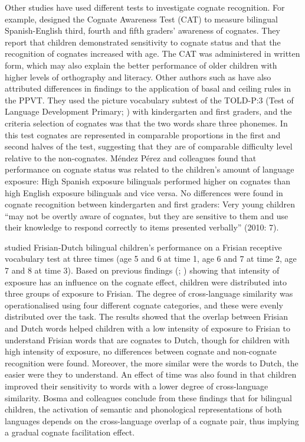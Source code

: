 \documentclass[output=paper,modfonts,nonflat,newtxmath]{langsci/langscibook}
\begin{document}
Other studies have used different tests to investigate cognate recognition. For example, \citet{MalabongaEtAl2008} designed the Cognate Awareness Test (CAT) to measure bilingual Spanish-English third, fourth and fifth graders’ awareness of cognates. They report that children demonstrated sensitivity to cognate status and that the recognition of cognates increased with age. The CAT was administered in written form, which may also explain the better performance of older children with higher levels of orthography and literacy. Other authors such as \citet{MendezPerezEtAl2010} have also attributed differences in findings to the application of basal and ceiling rules in the PPVT. They used the picture vocabulary subtest of the TOLD-P:3 (Test of Language Development Primary; \citealt{NewcomerHammill1997}) with kindergarten and first graders, and the criteria selection of cognates was that the two words share three phonemes. In this test cognates are represented in comparable proportions in the first and second halves of the test, suggesting that they are of comparable difficulty level relative to the non-cognates. Méndez Pérez and colleagues found that performance on cognate status was related to the children’s amount of language exposure: High Spanish exposure bilinguals performed higher on cognates than high English exposure bilinguals and vice versa. No differences were found in cognate recognition between kindergarten and first graders: Very young children “may not be overtly aware of cognates, but they are sensitive to them and use their knowledge to respond correctly to items presented verbally” (2010: 7).

 {\citet{BosmaEtAl2019} studied Frisian-Dutch bilingual children’s performance on a Frisian receptive vocabulary test at three times (age 5 and 6 at time 1, age 6 and 7 at time 2, age 7 and 8 at time 3). Based on previous findings (\citealt{MendezPerezEtAl2010}; \citealt{Dijkstra2013}) showing that intensity of exposure has an influence on the cognate effect, children were distributed into three groups of exposure to Frisian. The degree of cross-language similarity was operationalised using four different cognate categories, and these were evenly distributed over the task. The results showed that the overlap between Frisian and Dutch words helped children with a low intensity of exposure to Frisian to understand Frisian words that are cognates to Dutch, though for children with high intensity of exposure, no differences between cognate and non-cognate recognition were found. Moreover, the more similar were the words to Dutch, the easier were they to understand. An effect of time was also found in that children improved their sensitivity to words with a lower degree of cross-language similarity. Bosma and colleagues conclude from these findings that for bilingual children, the activation of semantic and phonological representations of both languages depends on the cross-language overlap of a cognate pair, thus implying a gradual cognate facilitation effect.}
\end{document}
